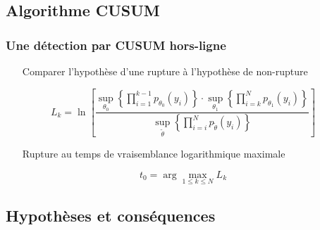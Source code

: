 \documentclass{beamer}
\begin{document}
\subsection{Algorithme CUSUM}

\begin{frame}

	\frametitle{Une détection par CUSUM hors-ligne}

	\begin{itemize}
		\item[Comparer] l'hypothèse d'une rupture à l'hypothèse de non-rupture
	\end{itemize}

\vspace{-.4cm}
	\begin{equation}
		L _k =\ln \left[ \frac{\sup_{\theta_0}\left\{ \prod_{i=1}^{k-1} p_{\theta_0}(y_i) \right\} \cdot \sup_{\theta_1} \left\{ \prod_{i = k}^{N}p_{\theta_1}(y_i) \right\}}{\sup_{\tilde\theta}\left\{\prod_{i=i}^{N}p_{\tilde{\theta}}(y_i)\right\}} \right]
	\end{equation}
\phantom{kcahkcah}

	\begin{itemize}
		\item[Rupture] au temps de vraisemblance logarithmique maximale
	\end{itemize}

\vspace{-.4cm}
	\begin{equation}
		t_0 = \arg \max_{1 \leq k \leq N} L_k
	\end{equation}
	
\end{frame}

\subsection{Hypothèses et conséquences}
\end{document}
